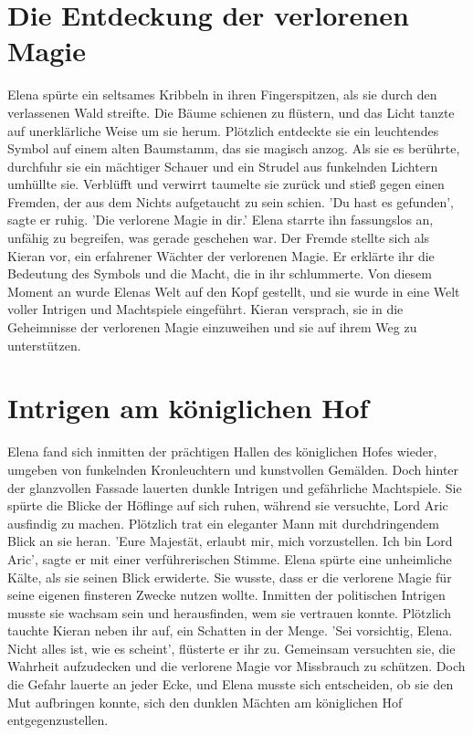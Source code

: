 \documentclass[12pt]{article} %
\begin{document}
\clearpage
\tableofcontents
\clearpage


\section{ Die Entdeckung der verlorenen Magie }
\begin{minipage}{\textwidth}
    Elena spürte ein seltsames Kribbeln in ihren Fingerspitzen, als sie durch den verlassenen Wald streifte. Die Bäume schienen zu flüstern, und das Licht tanzte auf unerklärliche Weise um sie herum. Plötzlich entdeckte sie ein leuchtendes Symbol auf einem alten Baumstamm, das sie magisch anzog. Als sie es berührte, durchfuhr sie ein mächtiger Schauer und ein Strudel aus funkelnden Lichtern umhüllte sie. Verblüfft und verwirrt taumelte sie zurück und stieß gegen einen Fremden, der aus dem Nichts aufgetaucht zu sein schien. 'Du hast es gefunden', sagte er ruhig. 'Die verlorene Magie in dir.' Elena starrte ihn fassungslos an, unfähig zu begreifen, was gerade geschehen war. Der Fremde stellte sich als Kieran vor, ein erfahrener Wächter der verlorenen Magie. Er erklärte ihr die Bedeutung des Symbols und die Macht, die in ihr schlummerte. Von diesem Moment an wurde Elenas Welt auf den Kopf gestellt, und sie wurde in eine Welt voller Intrigen und Machtspiele eingeführt. Kieran versprach, sie in die Geheimnisse der verlorenen Magie einzuweihen und sie auf ihrem Weg zu unterstützen.
\end{minipage}

\section{ Intrigen am königlichen Hof }
\begin{minipage}{\textwidth}
    Elena fand sich inmitten der prächtigen Hallen des königlichen Hofes wieder, umgeben von funkelnden Kronleuchtern und kunstvollen Gemälden. Doch hinter der glanzvollen Fassade lauerten dunkle Intrigen und gefährliche Machtspiele. Sie spürte die Blicke der Höflinge auf sich ruhen, während sie versuchte, Lord Aric ausfindig zu machen. Plötzlich trat ein eleganter Mann mit durchdringendem Blick an sie heran. 'Eure Majestät, erlaubt mir, mich vorzustellen. Ich bin Lord Aric', sagte er mit einer verführerischen Stimme. Elena spürte eine unheimliche Kälte, als sie seinen Blick erwiderte. Sie wusste, dass er die verlorene Magie für seine eigenen finsteren Zwecke nutzen wollte. Inmitten der politischen Intrigen musste sie wachsam sein und herausfinden, wem sie vertrauen konnte. Plötzlich tauchte Kieran neben ihr auf, ein Schatten in der Menge. 'Sei vorsichtig, Elena. Nicht alles ist, wie es scheint', flüsterte er ihr zu. Gemeinsam versuchten sie, die Wahrheit aufzudecken und die verlorene Magie vor Missbrauch zu schützen. Doch die Gefahr lauerte an jeder Ecke, und Elena musste sich entscheiden, ob sie den Mut aufbringen konnte, sich den dunklen Mächten am königlichen Hof entgegenzustellen.
\end{minipage}
\end{document}
